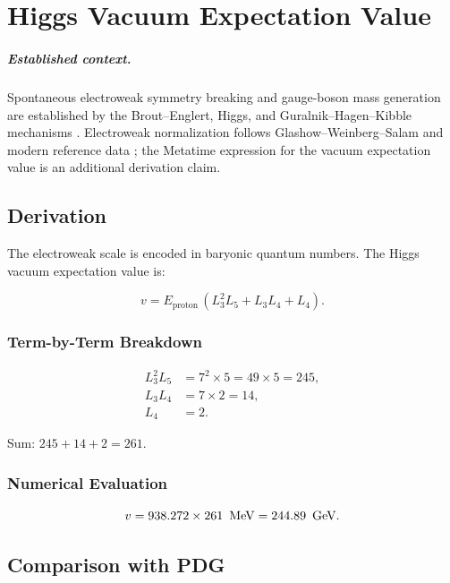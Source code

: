 \chapter{Higgs Vacuum Expectation Value}
\label{ch:higgs_vev}


\paragraph{Established context.}
Spontaneous electroweak symmetry breaking and gauge-boson mass generation are
established by the Brout--Englert, Higgs, and Guralnik--Hagen--Kibble mechanisms
\cite{EnglertBrout1964,Higgs1964,GHK1964}.  Electroweak normalization follows
Glashow--Weinberg--Salam and modern reference data
\cite{Glashow1961,Weinberg1967,Salam1968,PDG2024,CODATA2022}; the Metatime
expression for the vacuum expectation value is an additional derivation claim.

\section{Derivation}

The electroweak scale is encoded in baryonic quantum numbers.  The Higgs
vacuum expectation value is:

\begin{equation}
v = E_{\text{proton}}\,(L_3^2 L_5 + L_3 L_4 + L_4).
\label{eq:vev}
\end{equation}

\subsection{Term-by-Term Breakdown}

\[
\begin{aligned}
L_3^2 L_5 &= 7^2 \times 5 = 49 \times 5 = 245, \\
L_3 L_4   &= 7 \times 2 = 14, \\
L_4       &= 2.
\end{aligned}
\]

Sum: \(245 + 14 + 2 = 261\).

\subsection{Numerical Evaluation}

\[
v = 938.272 \times 261\ \mev = 244.89\ \gev.
\]

\section{Comparison with PDG}

